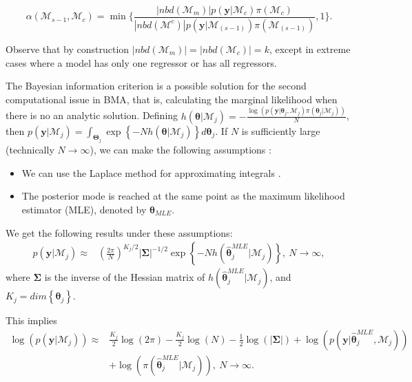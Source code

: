 \begin{equation*}
	\alpha (\mathcal{M}_{s-1},\mathcal{M}_{c})=\min \bigg \{ \frac{|nbd(\mathcal{M}_m)|p(\bm{y} | \mathcal{M}_c)\pi(\mathcal{M}_c)}{|nbd(\mathcal{M}^{c})|p(\bm{y}| \mathcal{M}_{(s-1)})\pi(\mathcal{M}_{(s-1)})},1 \bigg \}.
\end{equation*}

Observe that by construction $|nbd(\mathcal{M}_m)|=|nbd(\mathcal{M}_c)|=k$, except in extreme cases where a model has only one regressor or has all regressors.

The Bayesian information criterion is a possible solution for the second computational issue in BMA, that is, calculating the marginal likelihood when there is no an analytic solution. Defining $h(\bm{\theta}|\mathcal{M}_j)=-\frac{\log(p(\bm{y}| \bm{\theta}_j,\mathcal{M}_j)\pi(\bm{\theta}_j | \mathcal{M}_j))}{N}$, then $p(\bm{y} | \mathcal{M}_j)=\int_{\bm{\Theta}_j} \exp\left\{-N h(\bm{\theta}|\mathcal{M}_j)\right\}  d\bm{\theta}_{j}$. If $N$ is sufficiently large (technically $N\to \infty$), we can make the following assumptions \cite{Hoeting1999}:

\begin{itemize}
	\item We can use the Laplace method for approximating integrals \cite{Tierney1986}.
	\item The posterior mode is reached at the same point as the maximum likelihood estimator (MLE), denoted by $\hat{\bm{\theta}}_{MLE}$.
\end{itemize}

We get the following results under these assumptions:
\begin{align*}
	p(\bm{y} | \mathcal{M}_j)\approx&\left( \frac{2\pi}{N}\right)^{K_j/2}|\bm{\Sigma}|^{-1/2} \exp\left\{-N h(\bm{\hat{\theta}}_j^{MLE}|\mathcal{M}_j)\right\}, \ N\rightarrow\infty,
\end{align*}
where $\bm{\Sigma}$ is the inverse of the Hessian matrix of $h(\bm{\hat{\theta}}_j^{MLE}|\mathcal{M}_j)$, and $K_j=dim\left\{\bm{\theta}_j\right\}$.

This implies
\begin{align*}
	\log\left(p(\bm{y} | \mathcal{M}_j)\right)\approx& \frac{K_j}{2}\log(2\pi)- \frac{K_j}{2}\log(N) -\frac{1}{2}\log(|\bm{\Sigma}|) + \log(p(\bm{y}| \bm{\hat{\theta}}_j^{MLE},\mathcal{M}_j))\\
	&+\log(\pi(\bm{\hat{\theta}}_j^{MLE} | \mathcal{M}_j)), \ N\rightarrow\infty.
\end{align*}


